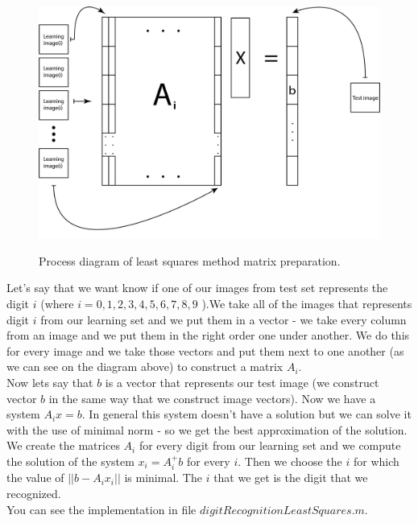 \documentclass[12pt]{article}
\begin{document}
\begin{figure}[h]
	\centering
	\includegraphics[clip,scale=0.68]{images/matrike.png}\underline{}
	\caption[Process diagram of least squares method matrix preparation]{Process diagram of least squares method matrix preparation.}
	
\end{figure}

\newpage
Let's say that we want know if one of our images from test set represents the digit $i$ (where $i = {0, 1, 2, 3, 4, 5, 6, 7, 8, 9}$ ).We take all of the images that represents digit $i$ from our learning set and we put them in a vector - we take every column from an image and we put them in the right order one under another. We do this for every image and we take those vectors and put them next to one another (as we can see on the diagram above) to construct a matrix \textbf{$A_{i}$}.\\
\newline
Now lets say that $b$ is a vector that represents our test image (we construct vector $b$ in the same way that we construct image vectors). Now we have a system $A_{i}x = b$. In general this system doesn't have a solution but we can solve it with the use of minimal norm - so we get the best approximation of the solution. We create the matrices $A_{i}$ for every digit from our learning set and we compute the solution of the system $x_{i} = A^{+}_{i}b$ for every $i$. Then we choose the $i$ for which the value of $|| b - A_{i}x_{i} ||$ is minimal. The $i$ that we get is the digit that we recognized.\\
\newline
You can see the implementation in file $digitRecognitionLeastSquares.m$.
\end{document}
